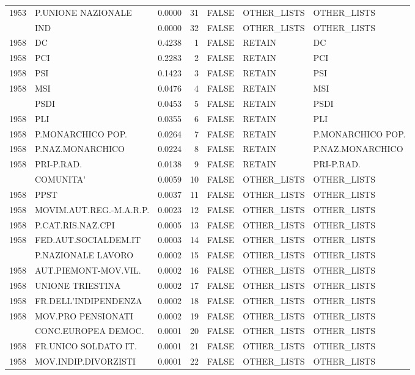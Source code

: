\begin{longtable}[t]{rlrrlll}
1953 & P.UNIONE NAZIONALE & 0.0000 & 31 & FALSE & OTHER\_LISTS & OTHER\_LISTS\\
\addlinespace
1953 & IND & 0.0000 & 32 & FALSE & OTHER\_LISTS & OTHER\_LISTS\\
1958 & DC & 0.4238 & 1 & FALSE & RETAIN & DC\\
1958 & PCI & 0.2283 & 2 & FALSE & RETAIN & PCI\\
1958 & PSI & 0.1423 & 3 & FALSE & RETAIN & PSI\\
1958 & MSI & 0.0476 & 4 & FALSE & RETAIN & MSI\\
\addlinespace
1958 & PSDI & 0.0453 & 5 & FALSE & RETAIN & PSDI\\
1958 & PLI & 0.0355 & 6 & FALSE & RETAIN & PLI\\
1958 & P.MONARCHICO POP. & 0.0264 & 7 & FALSE & RETAIN & P.MONARCHICO POP.\\
1958 & P.NAZ.MONARCHICO & 0.0224 & 8 & FALSE & RETAIN & P.NAZ.MONARCHICO\\
1958 & PRI-P.RAD. & 0.0138 & 9 & FALSE & RETAIN & PRI-P.RAD.\\
\addlinespace
1958 & COMUNITA' & 0.0059 & 10 & FALSE & OTHER\_LISTS & OTHER\_LISTS\\
1958 & PPST & 0.0037 & 11 & FALSE & OTHER\_LISTS & OTHER\_LISTS\\
1958 & MOVIM.AUT.REG.-M.A.R.P. & 0.0023 & 12 & FALSE & OTHER\_LISTS & OTHER\_LISTS\\
1958 & P.CAT.RIS.NAZ.CPI & 0.0005 & 13 & FALSE & OTHER\_LISTS & OTHER\_LISTS\\
1958 & FED.AUT.SOCIALDEM.IT & 0.0003 & 14 & FALSE & OTHER\_LISTS & OTHER\_LISTS\\
\addlinespace
1958 & P.NAZIONALE LAVORO & 0.0002 & 15 & FALSE & OTHER\_LISTS & OTHER\_LISTS\\
1958 & AUT.PIEMONT-MOV.VIL. & 0.0002 & 16 & FALSE & OTHER\_LISTS & OTHER\_LISTS\\
1958 & UNIONE TRIESTINA & 0.0002 & 17 & FALSE & OTHER\_LISTS & OTHER\_LISTS\\
1958 & FR.DELL'INDIPENDENZA & 0.0002 & 18 & FALSE & OTHER\_LISTS & OTHER\_LISTS\\
1958 & MOV.PRO PENSIONATI & 0.0002 & 19 & FALSE & OTHER\_LISTS & OTHER\_LISTS\\
\addlinespace
1958 & CONC.EUROPEA DEMOC. & 0.0001 & 20 & FALSE & OTHER\_LISTS & OTHER\_LISTS\\
1958 & FR.UNICO SOLDATO IT. & 0.0001 & 21 & FALSE & OTHER\_LISTS & OTHER\_LISTS\\
1958 & MOV.INDIP.DIVORZISTI & 0.0001 & 22 & FALSE & OTHER\_LISTS & OTHER\_LISTS\\

\end{longtable}
